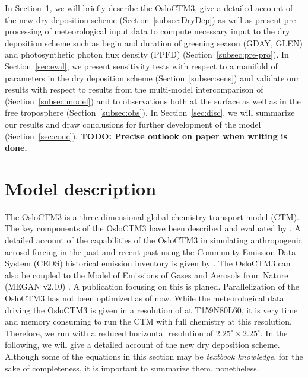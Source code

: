 \documentclass[gmd, manuscript]{copernicus}
\begin{document}
In Section~\ref{sec:model_des}, we will briefly describe the OsloCTM3, give a detailed account of the new dry deposition scheme (Section~\ref{subsec:DryDep}) as well as present pre-processing of meteorological input data to compute necessary input to the dry deposition scheme such as begin and duration of greening season (GDAY, GLEN) and photosynthetic photon flux density (PPFD) (Section~\ref{subsec:pre-pro}). In Section~\ref{sec:eval}, we present sensitivity tests with respect to a manifold of parameters in the dry deposition scheme (Section~\ref{subsec:sens}) and validate our results with respect to results from the multi-model intercomparison of \citet{ACP:Hardacre2015} (Section~\ref{subsec:model}) and to observations both at the surface as well as in the free troposphere (Section~\ref{subsec:obs}). In Section~\ref{sec:disc}, we will summarize our results and draw conclusions for further development of the model (Section~\ref{sec:conc}).
{\bf TODO: Precise outlook on paper when writing is done.}
\section{Model description}
\label{sec:model_des}
The OsloCTM3 is a three dimensional global chemistry transport model (CTM). The key components of the OsloCTM3 have been described and evaluated by \citet{GMD:Sovde2012}. A detailed account of the capabilities of the OsloCTM3 in simulating anthropogenic aerosol forcing in the past and recent past using the Community Emission Data System (CEDS) historical emission inventory \citep{GMD:Hoesly2018} is given by \citet{GMD:Lund2018}. The OsloCTM3 can also be coupled to the Model of Emissions of Gases and Aerosols from Nature (MEGAN v2.10) \citep{ACP:Guenther2006}. A publication focusing on this is planed. Parallelization of the OsloCTM3 has not been optimized as of now. While the meteorological data driving the OsloCTM3 is given in a resolution of at T159N80L60, it is very time and memory consuming to run the CTM with full chemistry at this resolution. Therefore, we run with a reduced horizontal resolution of $2.25^\circ\times2.25^\circ$. In the following, we will give a detailed account of the new dry deposition scheme. Although some of the equations in this section may be \emph{textbook knowledge}, for the sake of completeness, it is important to summarize them, nonetheless.
\end{document}
